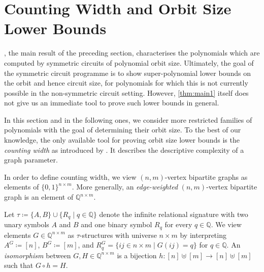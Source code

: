 \documentclass[11pt, DIV=15]{scrarticle}
\theoremstyle{definition}
\theoremstyle{plain}
\theoremstyle{remark}
\begin{document}
	\section{Counting Width and Orbit Size Lower Bounds}
	
	, the main result of the preceding section, characterises the polynomials which are computed by symmetric circuits of polynomial orbit size. Ultimately, the goal of the symmetric circuit programme is to show super-polynomial lower bounds on the orbit and hence circuit size, for polynomials for which this is not currently possible in the non-symmetric circuit setting. However, \cref{thm:main1} itself does not give us an immediate tool to prove such lower bounds in general. 
	
	In this section and in the following ones, we consider more restricted families of polynomials with the goal of determining their orbit size.
	To the best of our knowledge, the only available tool for proving orbit size lower bounds is the \emph{counting width} as introduced by \textcite{dawar_definability_2017}.
	It describes the descriptive complexity of a graph parameter.
	
	In order to define counting width, we view $(n,m)$-vertex bipartite graphs as elements of $\{0,1\}^{n \times m}$.
	More generally, an \emph{edge-weighted} $(n,m)$-vertex bipartite graph is an element of $\mathbb{Q}^{n \times m}$. 
	
	Let $\tau \coloneqq \{A, B\} \cup \{R_q \mid q \in \mathbb{Q}\}$ denote the infinite relational signature with two unary symbols $A$ and $B$ and one binary symbol $R_q$ for every $q \in \mathbb{Q}$.
	We view elements $G \in \mathbb{Q}^{n \times m}$ as $\tau$-structures with universe $n \times m$ by interpreting $A^G \coloneqq [n]$, $B^G \coloneqq [m]$, and $R_q^G = \{ij \in n \times m \mid G(ij) = q\}$ for $q \in \mathbb{Q}$.
	An \emph{isomorphism} between $G, H \in \mathbb{Q}^{n \times m}$ is a bijection $h \colon [n] \uplus [m] \to [n] \uplus [m]$ such that $G \circ h = H$.
	
\end{document}
